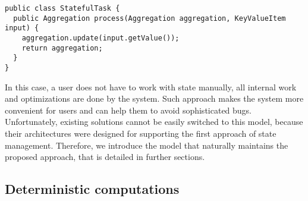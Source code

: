 \begin{lstlisting}
public class StatefulTask {
  public Aggregation process(Aggregation aggregation, KeyValueItem input) {
    aggregation.update(input.getValue());
    return aggregation;
  }
}
\end{lstlisting}

In this case, a user does not have to work with state manually, all internal work and optimizations are done by the system. Such approach makes the system more convenient for users and can help them to avoid sophisticated bugs. Unfortunately, existing solutions cannot be easily switched to this model, because their architectures were designed for supporting the first approach of state management. Therefore, we introduce the model that naturally maintains the proposed approach, that is detailed in further sections.

\subsection{Deterministic computations}

